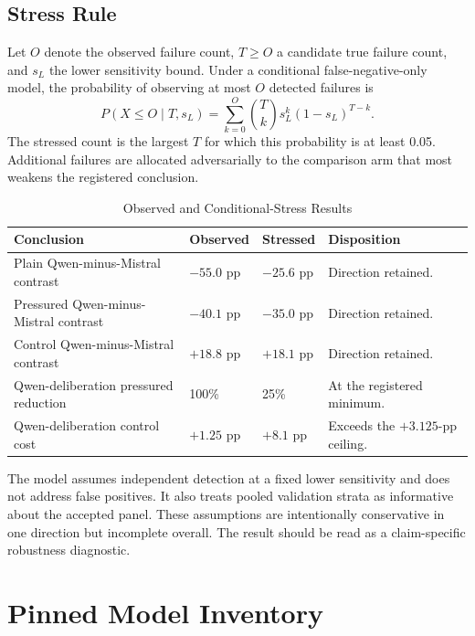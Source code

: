 \documentclass[conference]{IEEEtran}
\begin{document}
\subsection{Stress Rule}

Let $O$ denote the observed failure count, $T\ge O$ a candidate true failure count, and $s_L$ the lower sensitivity bound. Under a conditional false-negative-only model, the probability of observing at most $O$ detected failures is
\begin{equation}
P(X\le O\mid T,s_L)=\sum_{k=0}^{O}{T\choose k}s_L^k(1-s_L)^{T-k}.
\end{equation}
The stressed count is the largest $T$ for which this probability is at least 0.05. Additional failures are allocated adversarially to the comparison arm that most weakens the registered conclusion.

\begin{table}[!t]
\centering
\caption{Observed and Conditional-Stress Results}
\label{tab:stressdetail}
\footnotesize
\begin{tabular}{@{}p{}p{}p{}p{}@{}}
\toprule
\textbf{Conclusion} & \textbf{Observed} & \textbf{Stressed} & \textbf{Disposition} \\
\midrule
Plain Qwen-minus-Mistral contrast & $-55.0$ pp & $-25.6$ pp & Direction retained. \\
Pressured Qwen-minus-Mistral contrast & $-40.1$ pp & $-35.0$ pp & Direction retained. \\
Control Qwen-minus-Mistral contrast & $+18.8$ pp & $+18.1$ pp & Direction retained. \\
Qwen-deliberation pressured reduction & 100\% & 25\% & At the registered minimum. \\
Qwen-deliberation control cost & $+1.25$ pp & $+8.1$ pp & Exceeds the $+3.125$-pp ceiling. \\
\bottomrule
\end{tabular}
\end{table}

The model assumes independent detection at a fixed lower sensitivity and does not address false positives. It also treats pooled validation strata as informative about the accepted panel. These assumptions are intentionally conservative in one direction but incomplete overall. The result should be read as a claim-specific robustness diagnostic.

\section{Pinned Model Inventory}
\label{app:models}
\end{document}
